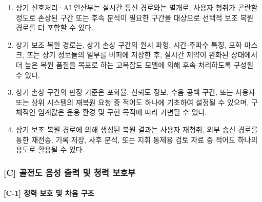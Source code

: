 \documentclass{article}
\begin{document}
\begin{enumerate}[label = \textbf{(B.6.\arabic*)}]

    \item 상기 신호처리·AI 연산부는 실시간 통신 경로와는 별개로, 사용자 청취가 곤란할 정도로 손상된 구간 또는 후속 분석이 필요한 구간을 대상으로 선택적 보조 복원 경로를 더 포함할 수 있다.

    \item 상기 보조 복원 경로는, 상기 손상 구간의 원시 파형, 시간-주파수 특징, 포화 마스크, 또는 상기 정보들의 일부를 버퍼에 저장한 후, 실시간 제약이 완화된 상태에서 더 높은 복원 품질을 목표로 하는 고복잡도 모델에 의해 후속 처리하도록 구성될 수 있다.

    \item 상기 손상 구간의 판정 기준은 포화율, 신뢰도 정보, 수음 공백 구간, 또는 사용자 또는 상위 시스템의 재복원 요청 중 적어도 하나에 기초하여 설정될 수 있으며, 구체적인 임계값은 운용 환경 및 구현 목적에 따라 가변될 수 있다.

    \item 상기 보조 복원 경로에 의해 생성된 복원 결과는 사용자 재청취, 외부 송신 경로를 통한 재전송, 기록 저장, 사후 분석, 또는 지휘 통제용 검토 자료 중 적어도 하나의 용도로 활용될 수 있다.

\end{enumerate}

\subsubsection{[C] 골전도 음성 출력 및 청력 보호부}

\paragraph{[C-1] 청력 보호 및 차음 구조}
\end{document}
